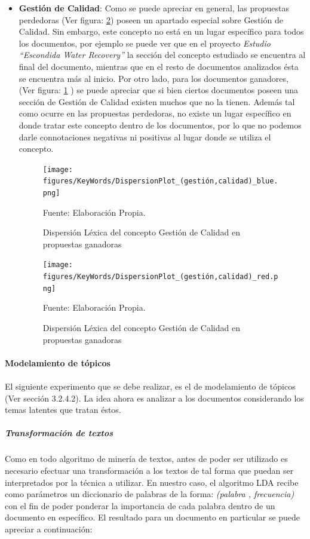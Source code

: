 \begin{itemize}
        \item \textbf{Gestión de Calidad}: Como se puede apreciar en general, las propuestas perdedoras (Ver figura: \ref{fig:GC_Loss}) poseen un apartado especial sobre Gestión de Calidad. Sin embargo, este concepto no está en un lugar específico para todos los documentos, por ejemplo se puede ver que en el proyecto \textit{Estudio ``Escondida Water Recovery''} la sección del concepto estudiado se encuentra al final del documento, mientras que en el resto de documentos analizados ésta se encuentra más al inicio. Por otro lado, para los documentos ganadores, (Ver figura: \ref{fig:GC_Win} ) se puede apreciar que si bien ciertos documentos poseen una sección de Gestión de Calidad existen muchos que no la tienen. Además tal como ocurre en las propuestas perdedoras, no existe un lugar específico en donde tratar este concepto dentro de los documentos, por lo que no podemos darle connotaciones negativas ni positivas al lugar donde se utiliza el concepto.
        
        \begin{figure}[H]
        \centering
        \texttt{[image: figures/KeyWords/DispersionPlot\_(gestión,calidad)\_blue.png]}
        \caption{\label{fig:GC_Win} Dispersión Léxica del concepto Gestión de Calidad en propuestas ganadoras} Fuente: Elaboración Propia.
        \end{figure}
        
        \begin{figure}[H]
        \centering
        \texttt{[image: figures/KeyWords/DispersionPlot\_(gestión,calidad)\_red.png]}
        \caption{\label{fig:GC_Loss} Dispersión Léxica del concepto Gestión de Calidad en propuestas ganadoras} Fuente: Elaboración Propia.
        \end{figure}
    \end{itemize}

    \paragraph{Modelamiento de tópicos}
    \paragraph*{}
    El siguiente experimento que se debe realizar, es el de modelamiento de tópicos (Ver sección 3.2.4.2). La idea ahora es analizar a los documentos considerando los temas latentes que tratan éstos.  
    
    \subparagraph{Transformación de textos}
    \subparagraph*{}
    Como en todo algoritmo de minería de textos, antes de poder ser utilizado es necesario efectuar una transformación a los textos de tal forma que puedan ser interpretados por la técnica a utilizar. En nuestro caso, el algoritmo LDA recibe como parámetros un diccionario de palabras de la forma: \textit{(palabra , frecuencia)} con el fin de poder ponderar la importancia de cada palabra dentro de un documento en específico. El resultado para un documento en particular se puede apreciar a continuación:
    
